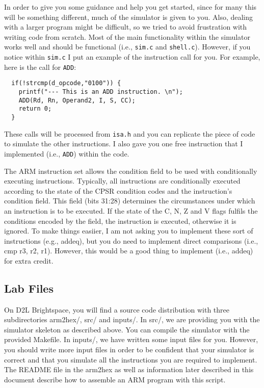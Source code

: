 \documentclass{article}
\begin{document}
In order to give you some guidance and help you get started, since for
many this will be something different, much of the simulator is given
to you.  Also, dealing with a larger
program might be difficult, so we tried to avoid frustration with
writing code from scratch.   Most of the main functionality within the
simulator works well and should be functional (i.e., \verb+sim.c+ and
\verb+shell.c+).  However, if you notice within \verb+sim.c+ I put
an example of the instruction call for you.  For example, here is the
call for
\verb+ADD+:
\begin{verbatim}
  if(!strcmp(d_opcode,"0100")) {
    printf("--- This is an ADD instruction. \n");
    ADD(Rd, Rn, Operand2, I, S, CC);
    return 0;
  }
\end{verbatim}
These calls will be processed from \verb+isa.h+ and you can replicate
the piece of code to simulate the other instructions.  
I also gave you one free instruction that I implemented (i.e.,
\verb+ADD+) within the code.  

The ARM instruction set allows the condition field to be used with
conditionally executing instructions.  Typically, all instructions are
conditionally executed according to the state of the CPSR condition
codes and the instruction's condition field. This field (bits 31:28)
determines the circumstances under which an instruction is to be
executed. If the state of the C, N, Z and V flags fulfils the
conditions encoded by the field, the instruction is executed,
otherwise it is ignored.  
To make things easiier, I am not asking you
to implement these sort of instructions (e.g., addeq), but you do need
to implement direct comparisons (i.e., cmp r3, r2, r1).  However, this
would be a good thing to implement (i.e., addeq) for extra credit.


\subsection{Lab Files}

On D2L Brightspace, you will find a source code
distribution with three subdirectories arm2hex/, src/ and inputs/. In
src/, we are
providing you with the simulator skeleton as described above. You can
compile the simulator with the provided Makefile. In inputs/, we have
written some input files for you.  However, you should write more
input files in
order to be confident that your simulator is correct and that you
simulate all the instructions you are required to implement.
The README file in the arm2hex as well as information later described
in this document
describe how to assemble an ARM program with this script.  
\end{document}
